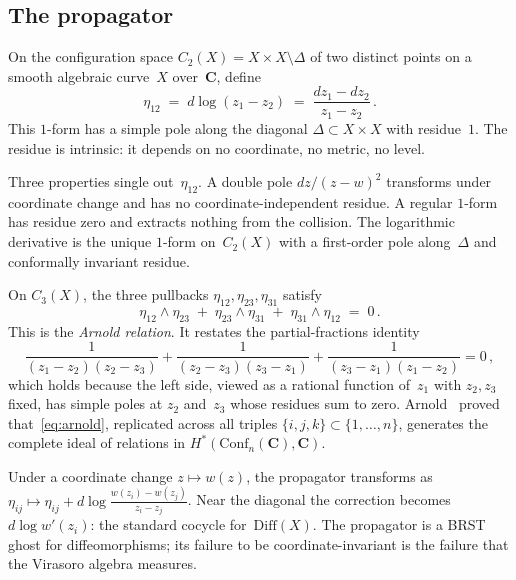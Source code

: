 \documentclass[11pt,reqno]{amsart}
\theoremstyle{definition}
\theoremstyle{remark}
\newcommand{\Conf}{\mathrm{Conf}}
\newcommand{\Diff}{\mathrm{Diff}}
\renewcommand{\Bbbk}{\mathbf{C}}
\numberwithin{equation}{section}
\begin{document}
\subsection{The propagator}
\label{ssec:propagator}

On the configuration space $C_2(X) = X \times X \setminus \Delta$
of two distinct points on a smooth algebraic curve~$X$
over~$\Bbbk$, define
\begin{equation}\label{eq:eta}
\eta_{12}
\;=\;
d\log(z_1 - z_2)
\;=\;
\frac{dz_1 - dz_2}{z_1 - z_2}\,.
\end{equation}
This $1$-form has a simple pole along the diagonal
$\Delta \subset X \times X$ with residue~$1$. The residue is
intrinsic: it depends on no coordinate, no metric, no level.

Three properties single out~$\eta_{12}$. A double pole
$dz/(z-w)^2$ transforms under coordinate change and has no
coordinate-independent residue. A regular $1$-form has
residue zero and extracts nothing from the collision. The
logarithmic derivative is the unique $1$-form on~$C_2(X)$
with a first-order pole along~$\Delta$ and conformally
invariant residue.

On $C_3(X)$, the three pullbacks
$\eta_{12}, \eta_{23}, \eta_{31}$ satisfy
\begin{equation}\label{eq:arnold}
\eta_{12} \wedge \eta_{23}
\;+\;
\eta_{23} \wedge \eta_{31}
\;+\;
\eta_{31} \wedge \eta_{12}
\;=\; 0\,.
\end{equation}
This is the \emph{Arnold relation}. It restates the
partial-fractions identity
\[
\frac{1}{(z_1 {-} z_2)(z_2 {-} z_3)}
+
\frac{1}{(z_2 {-} z_3)(z_3 {-} z_1)}
+
\frac{1}{(z_3 {-} z_1)(z_1 {-} z_2)}
= 0\,,
\]
which holds because the left side, viewed as a rational function
of~$z_1$ with $z_2, z_3$ fixed, has simple poles at $z_2$
and~$z_3$ whose residues sum to zero.
Arnold~\cite{Arnold69} proved that~\eqref{eq:arnold}, replicated
across all triples $\{i,j,k\} \subset \{1,\ldots,n\}$, generates
the complete ideal of relations in
$H^*(\Conf_n(\Bbbk), \Bbbk)$.

Under a coordinate change $z \mapsto w(z)$, the propagator
transforms as
$\eta_{ij} \mapsto \eta_{ij}
+ d\log\frac{w(z_i) - w(z_j)}{z_i - z_j}$.
Near the diagonal the correction becomes $d\log w'(z_i)$: the
standard cocycle for~$\Diff(X)$. The propagator is a BRST ghost
for diffeomorphisms; its failure to be coordinate-invariant is
the failure that the Virasoro algebra measures.
\end{document}
